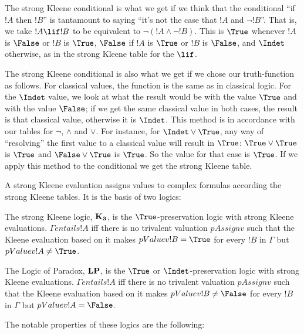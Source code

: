\documentclass[../../../include/open-logic-section]{subfiles}
\begin{document}
\begin{explain}

The strong Kleene conditional is what we get if we think that the conditional ``if $!A$ then $!B$'' is tantamount to saying ``it's not the case that $!A$ and $\lnot !B$''. That is, we take $!A \lif !B$ to be equivalent to $\lnot (!A \land \lnot !B)$. This is $\True$ whenever $!A$ is $\False$ or $!B$ is $\True$, $\False$ if $!A$ is $\True$ or $!B$ is $\False$, and $\Indet$ otherwise, as in the strong Kleene table for the $\lif$.

The strong Kleene conditional is also what we get if we chose our truth-function as follows. For classical values, the function is the same as in classical logic. For the $\Indet$ value, we look at what the result would be with the value $\True$ and with the value $\False$; if we get the same classical value in both cases, the result is that classical value, otherwise it is $\Indet$. This method is in accordance with our tables for $\lnot$, $\land$ and $\lor$. For instance, for $\Indet \lor \True$, any way of ``resolving'' the first value to a classical value will result in $\True$: $\True \lor \True$ is $\True$ and $\False \lor \True$ is $\True$. So the value for that case is $\True$. If we apply this method to the conditional we get the strong Kleene table.

\end{explain}

A strong Kleene evaluation assigns values to complex formulas according the strong Kleene tables. It is the basis of two logics:

\begin{defn}
  \item The strong Kleene logic, $\mathbf{K_3}$, is the $\True$-preservation logic with strong Kleene evaluations. $\Gamma entails !A$ iff there is no trivalent valuation $pAssign{v}$ such that the Kleene evaluation based on it makes $pValue{v}{!B} = \True$ for every $!B$ in $\Gamma$ but $pValue{v}{!A} \neq \True$.
  \item The Logic of Paradox, $\mathbf{LP}$, is the $\True$ or $\Indet$-preservation logic with strong Kleene evaluations. $\Gamma entails !A$ iff there is no trivalent valuation $pAssign{v}$ such that the Kleene evaluation based on it makes $pValue{v}{!B} \neq \False$ for every $!B$ in $\Gamma$ but $pValue{v}{!A} = \False$.  
\end{defn}

The notable properties of these logics are the following:
\end{document}
